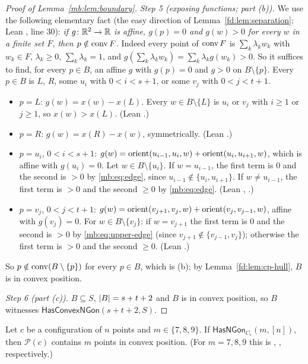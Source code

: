 \begin{proof}[Proof of Lemma~\ref{mb:lem:boundary}]
\emph{Step 5 (exposing functions; part (b)).} We use the following elementary fact (the easy direction of
Lemma~\ref{fd:lem:separation}; Lean , line 30): \emph{if $g\colon\mathbb R^2\to\mathbb R$ is affine, $g(p)=0$
and $g(w)>0$ for every $w$ in a finite set $F$, then $p\notin\operatorname{conv} F$.} Indeed every point of $\operatorname{conv} F$ is
$\sum_k\lambda_kw_k$ with $w_k\in F$, $\lambda_k\ge0$, $\sum_k\lambda_k=1$, and $g(\sum_k\lambda_kw_k)=\sum_k\lambda_k
g(w_k)>0$. So it suffices to find, for every $p\in B$, an affine $g$ with $g(p)=0$ and $g>0$ on $B\setminus\{p\}$. Every $p\in B$ is $L$, $R$, some $u_i$ with $0<i<s+1$, or some $v_j$ with $0<j<t+1$.
\begin{itemize}
\item $p=L$: $g(w)=x(w)-x(L)$. Every $w\in B\setminus\{L\}$ is $u_i$ or $v_j$ with $i\ge1$ or $j\ge1$, so $x(w)>x(L)$.
  (Lean .)
\item $p=R$: $g(w)=x(R)-x(w)$, symmetrically. (Lean .)
\item $p=u_i$, $0<i<s+1$: $g(w)=\operatorname{orient}(u_{i-1},u_i,w)+\operatorname{orient}(u_i,u_{i+1},w)$, which is affine with $g(u_i)=0$. Let
  $w\in B\setminus\{u_i\}$. If $w=u_{i-1}$, the first term is $0$ and the second is $>0$ by \eqref{mb:eq:edge}, since
  $u_{i-1}\notin\{u_i,u_{i+1}\}$. If $w\ne u_{i-1}$, the first term is $>0$ and the second $\ge0$ by \eqref{mb:eq:edge}.
  (Lean , .)
\item $p=v_j$, $0<j<t+1$: $g(w)=\operatorname{orient}(v_{j+1},v_j,w)+\operatorname{orient}(v_j,v_{j-1},w)$, affine with $g(v_j)=0$. For
  $w\in B\setminus\{v_j\}$: if $w=v_{j+1}$ the first term is $0$ and the second is $>0$ by \eqref{mb:eq:upper-edge}
  (since $v_{j+1}\notin\{v_{j-1},v_j\}$); otherwise the first term is $>0$ and the second $\ge0$. (Lean
  .)
\end{itemize}
So $p\notin\operatorname{conv}(B\setminus\{p\})$ for every $p\in B$, which is (b); by Lemma~\ref{fd:lem:cp-hull}, $B$ is in convex
position.

\emph{Step 6 (part (c)).} $B\subseteq S$, $\lvert B\rvert=s+t+2$ and $B$ is in convex position, so $B$ witnesses
$\mathsf{HasConvexNGon}(s+t+2,S)$.
\end{proof}

\begin{proposition}\label{mb:prop:gon}\raggedright
Let $c$ be a configuration of $n$ points and $m\in\{7,8,9\}$. If $\mathsf{HasNGon}_{C_c}(m,[n])$, then $\mathcal P(c)$
contains $m$ points in convex position. (For $m=7,8,9$ this is , ,
 respectively.)
\end{proposition}

